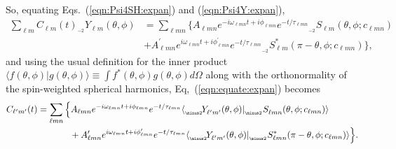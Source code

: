 \documentclass[11pt]{article}
\newcommand{\braket}[2]{\langle #1|#2\rangle}
\newcommand{\swY}[4][]{{}_{{}_{#2}}\!Y^{#1}_{#3}(#4)}
\newcommand{\swSH}[5][]{{}_{{}_{#2}}S^{#1}_{#3}(#4;#5)}
\begin{document}
So, equating Eqs.~(\ref{eqn:Psi4SH:expan}) and (\ref{eqn:Psi4Y:expan}), 
\begin{equation} \label{eqn:equate:expan}
\begin{aligned}
\sum_{\ell{m}} C_{\ell{m}}(t) \swY{\minus 2}{\ell{m}}{\theta,\phi} & = \sum_{\ell{m}n} \Big\{ A_{\ell{m}n} e^{-i\omega_{\ell{m}n}t+i\phi_{\ell{m}n}}e^{-t/\tau_{\ell{m}n}} \swSH{\minus 2}{\ell{m}}{\theta,\phi}{c_{\ell{m}n}}\\
& + A^\prime_{\ell{m}n} e^{i\omega_{\ell{m}n}t+i\phi^\prime_{\ell{m}n}}e^{-t/\tau_{\ell{m}n}} \swSH[*]{\minus 2}{\ell{m}}{\pi-\theta,\phi}{c_{\ell{m}n}} \Big\},
\end{aligned}
\end{equation}
and using the usual definition for the inner product $\braket{f(\theta, \phi)}{g(\theta, \phi)} \equiv \int{f^{*}(\theta, \phi) g(\theta, \phi) d\Omega}$ along with the orthonormality of the spin-weighted spherical harmonics, Eq,~(\ref{eqn:equate:expan}) becomes
\begin{equation} \label{clm:eq2}
\begin{aligned}
C_{\ell^\prime{m^\prime}}(t) &= \sum_{\ell{m}n} \Big\{ 
   A_{\ell{m}n} e^{-i\omega_{\ell{m}n}t+i\phi_{\ell{m}n}}e^{-t/\tau_{\ell{m}n}} 
   \braket{\swY{\minus 2}{\ell^\prime{m^\prime}}{\theta,\phi}}{\swSH{\minus 2}{\ell{m}n}{\theta,\phi}{c_{\ell{m}n}}} \\
& {}\hspace{0.5in} 
  + A^\prime_{\ell{m}n} e^{i\omega_{\ell{m}n}t+i\phi^\prime_{\ell{m}n}}e^{-t/\tau_{\ell{m}n}} 
   \braket{\swY{\minus 2}{\ell^\prime{m^\prime}}{\theta,\phi}}{\swSH[*]{\minus 2}{\ell{m}n}{\pi-\theta,\phi}{c_{\ell{m}n}}} \Big\}.
\end{aligned}
\end{equation}
\end{document}
